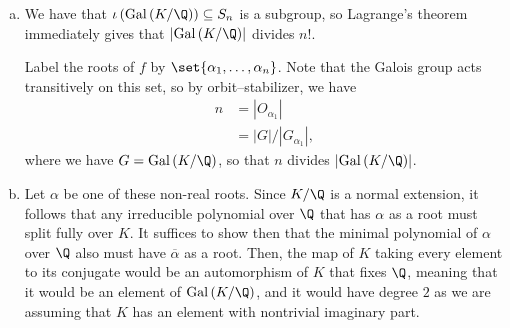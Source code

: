 \documentclass[10pt]{mypackage}
\begin{document}
\begin{solution}\hfill
  \begin{enumerate}[(a)]
    \item We have that $\iota\left( \operatorname{Gal}\left( K/\Q \right) \right)\subseteq S_n$ is a subgroup, so Lagrange's theorem immediately gives that $\left\vert \operatorname{Gal}\left( K/\Q \right) \right\vert$ divides $n!$.

      Label the roots of $f$ by $\set{\alpha_1,\dots,\alpha_n}$. Note that the Galois group acts transitively on this set, so by orbit--stabilizer, we have
      \begin{align*}
        n &= \left\vert O_{\alpha_1} \right\vert\\
          &= \left\vert G \right\vert/\left\vert G_{\alpha_1} \right\vert,
      \end{align*}
      where we have $G = \operatorname{Gal}\left( K/\Q \right)$, so that $n$ divides $\left\vert \operatorname{Gal}\left( K/\Q \right) \right\vert$.
    \item Let $\alpha$ be one of these non-real roots. Since $K/\Q$ is a normal extension, it follows that any irreducible polynomial over $\Q$ that has $\alpha$ as a root must split fully over $K$. It suffices to show then that the minimal polynomial of $\alpha$ over $\Q$ also must have $ \overline{\alpha} $ as a root. Then, the map of $K$ taking every element to its conjugate would be an automorphism of $K$ that fixes $\Q$, meaning that it would be an element of $\operatorname{Gal}\left( K/\Q \right)$, and it would have degree $2$ as we are assuming that $K$ has an element with nontrivial imaginary part.


\end{enumerate}
\end{solution}
\end{document}

